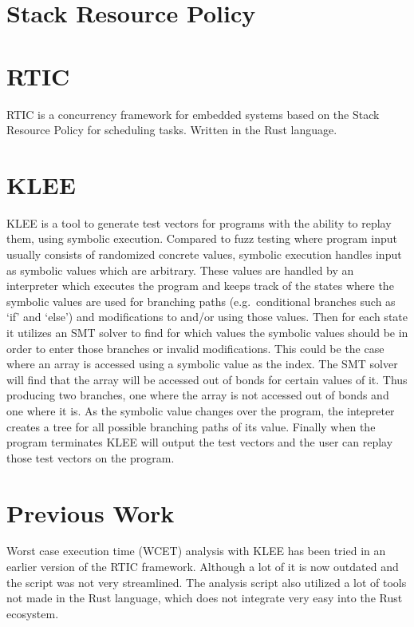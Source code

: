 \section{Stack Resource Policy}


\section{RTIC}
RTIC\cite{rticwebsite} is a concurrency framework for embedded systems based on the Stack Resource Policy\cite{srp} for scheduling tasks. Written in the Rust language.

\section{KLEE}
KLEE\cite{kleepaper} is a tool to generate test vectors for programs with the ability to replay them, using symbolic execution. Compared to fuzz testing where program input usually consists of randomized concrete values, symbolic execution handles input as symbolic values which are arbitrary. These values are handled by an interpreter which executes the program and keeps track of the states where the symbolic values are used for branching paths (e.g.\ conditional branches such as `if' and `else') and modifications to and/or using those values. Then for each state it utilizes an SMT solver to find for which values the symbolic values should be in order to enter those branches or invalid modifications. This could be the case where an array is accessed using a symbolic value as the index. The SMT solver will find that the array will be accessed out of bonds for certain values of it. Thus producing two branches, one where the array is not accessed out of bonds and one where it is. As the symbolic value changes over the program, the intepreter creates a tree for all possible branching paths of its value. Finally when the program terminates KLEE will output the test vectors and the user can replay those test vectors on the program.

\section{Previous Work}
Worst case execution time (WCET) analysis with KLEE has been tried in an earlier version of the RTIC framework\cite{lindner}.
Although a lot of it is now outdated and the script was not very streamlined. The analysis script also utilized a lot of tools not made in the Rust language, which does not integrate very easy into the Rust ecosystem.

